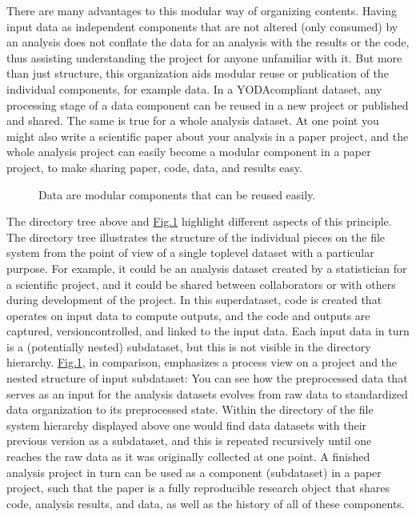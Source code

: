 \sphinxAtStartPar
There are many advantages to this modular way of organizing contents.
Having input data as independent components that are not altered (only
consumed) by an analysis does not conflate the data for
an analysis with the results or the code, thus assisting understanding
the project for anyone unfamiliar with it.
But more than just structure, this organization aids modular reuse or
publication of the individual components, for example data. In a
YODA\sphinxhyphen{}compliant dataset, any processing stage of a data component can
be reused in a new project or published and shared. The same is true
for a whole analysis dataset. At one point you might also write a
scientific paper about your analysis in a paper project, and the
whole analysis project can easily become a modular component in a paper
project, to make sharing paper, code, data, and results easy.

\begin{figure}[tbp]
\centering
\capstart

\noindent{}
\caption{Data are modular components that can be re\sphinxhyphen{}used easily.}\label{\detokenize{basics/101-127-yoda:dataset-modules}}\end{figure}

\sphinxAtStartPar
The directory tree above and \hyperref[\detokenize{basics/101-127-yoda:dataset-modules}]{Fig.\@ \ref{\detokenize{basics/101-127-yoda:dataset-modules}}} highlight different aspects
of this principle. The directory tree illustrates the structure of
the individual pieces on the file system from the point of view of
a single top\sphinxhyphen{}level dataset with a particular purpose. For example, it
could be an analysis dataset created by a statistician for a scientific
project, and it could be shared between collaborators or
with others during development of the project. In this
superdataset, code is created that operates on input data to
compute outputs, and the code and outputs are captured,
version\sphinxhyphen{}controlled, and linked to the input data. Each input data in turn
is a (potentially nested) subdataset, but this is not visible
in the directory hierarchy.
\hyperref[\detokenize{basics/101-127-yoda:dataset-modules}]{Fig.\@ \ref{\detokenize{basics/101-127-yoda:dataset-modules}}}, in comparison, emphasizes a process view on a project and
the nested structure of input subdataset:
You can see how the preprocessed data that serves as an input for
the analysis datasets evolves from raw data to
standardized data organization to its preprocessed state. Within
the  directory of the file system hierarchy displayed
above one would find data datasets with their previous version as
a subdataset, and this is repeated recursively until one reaches
the raw data as it was originally collected at one point. A finished
analysis project in turn can be used as a component (subdataset) in
a paper project, such that the paper is a fully reproducible research
object that shares code, analysis results, and data, as well as the
history of all of these components.

